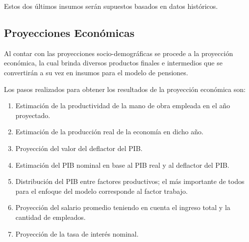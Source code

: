 Estos dos últimos insumos serán supuestos basados en datos históricos.

\begin{figure}[!ht]
  \centering
  \hspace*{-105pt}
\end{figure}

\subsection{Proyecciones Económicas}

Al contar con las proyecciones socio-demográficas se procede a la
proyección económica, la cual brinda diversos productos finales e
intermedios que se convertirán a su vez en insumos para el modelo de
pensiones.

Los pasos realizados para obtener los resultados de la proyección
económica son: \renewcommand{\theenumi}{\arabic{enumi}}

\begin{enumerate}
\item Estimación de la productividad de la mano de obra empleada en el año proyectado.
\item Estimación de la producción real de la economía en dicho año.
\item Proyección del valor del deflactor del PIB.
\item Estimación del PIB nominal en base al PIB real y al deflactor del PIB.
\item Distribución del PIB entre factores productivos; el más importante de todos para el enfoque del modelo corresponde al factor trabajo.
\item Proyección del salario promedio teniendo en cuenta el ingreso total y la cantidad de empleados.
\item Proyección de la tasa de interés nominal.
\end{enumerate}

